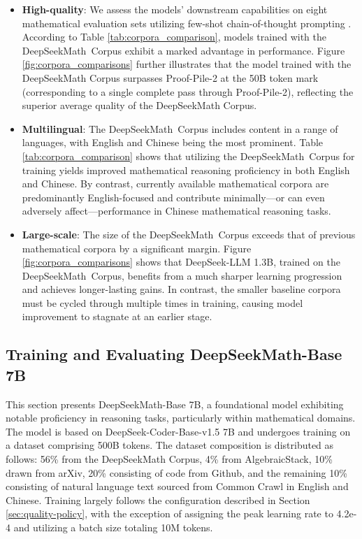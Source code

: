 \begin{itemize}[topsep=0pt]
\begin{itemize}[topsep=0pt]
    \item \textbf{High-quality}:
    We assess the models’ downstream capabilities on eight mathematical evaluation sets utilizing few-shot chain-of-thought prompting \cite{cot}. According to Table \ref{tab:corpora_comparison}, models trained with the DeepSeekMath~Corpus exhibit a marked advantage in performance. Figure \ref{fig:corpora_comparisons} further illustrates that the model trained with the DeepSeekMath Corpus surpasses Proof-Pile-2 at the 50B token mark (corresponding to a single complete pass through Proof-Pile-2), reflecting the superior average quality of the DeepSeekMath Corpus.
    \item \textbf{Multilingual}:
    The DeepSeekMath~Corpus includes content in a range of languages, with English and Chinese being the most prominent. Table \ref{tab:corpora_comparison} shows that utilizing the DeepSeekMath~Corpus for training yields improved mathematical reasoning proficiency in both English and Chinese. By contrast, currently available mathematical corpora are predominantly English-focused and contribute minimally—or can even adversely affect—performance in Chinese mathematical reasoning tasks.
    \item \textbf{Large-scale}:
    The size of the DeepSeekMath~Corpus exceeds that of previous mathematical corpora by a significant margin. Figure \ref{fig:corpora_comparisons} shows that DeepSeek-LLM 1.3B, trained on the DeepSeekMath~Corpus, benefits from a much sharper learning progression and achieves longer-lasting gains. In contrast, the smaller baseline corpora must be cycled through multiple times in training, causing model improvement to stagnate at an earlier stage.
\end{itemize}

\subsection{Training and Evaluating DeepSeekMath-Base 7B}

This section presents DeepSeekMath-Base 7B, a foundational model exhibiting notable proficiency in reasoning tasks, particularly within mathematical domains. The model is based on DeepSeek-Coder-Base-v1.5 7B \citep{deepseek-coder} and undergoes training on a dataset comprising 500B tokens. The dataset composition is distributed as follows: 56\% from the DeepSeekMath Corpus, 4\% from AlgebraicStack, 10\% drawn from arXiv, 20\% consisting of code from Github, and the remaining 10\% consisting of natural language text sourced from Common Crawl in English and Chinese. Training largely follows the configuration described in Section \ref{sec:quality-policy}, with the exception of assigning the peak learning rate to 4.2e-4 and utilizing a batch size totaling 10M tokens.


\end{itemize}
